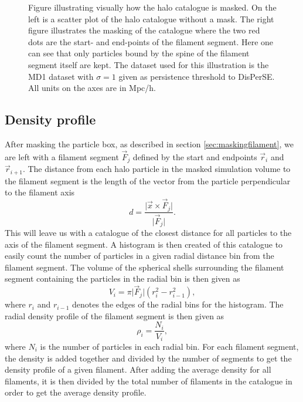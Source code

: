 \begin{figure}[htbp]
    \hspace{1em}%
    \caption{Figure illustrating visually how the halo catalogue is masked. On the left is a scatter plot of the halo catalogue without a mask. The right figure illustrates the masking of the catalogue where the two red dots are the start- and end-points of the filament segment. Here one can see that only particles bound by the spine of the filament segment itself are kept. The dataset used for this illustration is the MD1 dataset with $\sigma=1$ given as persistence threshold to DisPerSE. All units on the axes are in Mpc/h.}
    \label{fig:galaxy_catbbox}
\end{figure}
\subsection{Density profile}\label{sec:filamentdensity}
After masking the particle box, as described in section \ref{sec:maskingfilament},
we are left with a filament segment $\vec{F}_j$ defined by the start and
endpoints $\vec{r}_{i}$ and $\vec{r}_{i+1}$. The distance from each halo particle in
the masked simulation volume to the filament segment is the length of the vector
from the particle perpendicular to the filament axis
\begin{equation}\label{eq:distance_from_filament}
    d=\frac{\vert \vec{x}\times\vec{F}_j\vert}{\vert \vec{F}_j\vert}.
\end{equation}
This will leave us with a catalogue of the closest distance for all particles to
the axis of the filament segment. A histogram is then created of this catalogue
to easily count the number of particles in a given radial distance bin from the
filament segment. The volume of the spherical shells surrounding the filament segment
containing the particles in the radial bin is then given as
\begin{equation}
    V_i={\pi\vert \vec{F}_j\vert(r_i^2-r_{i-1}^2)},
\end{equation}
where $r_i$ and $r_{i-1}$ denotes the edges of the radial bins for the histogram.
The radial density profile of the filament segment is then given as
\begin{equation}
    \rho_i=\frac{N_i}{V_i},
\end{equation}
where $N_i$ is the number of particles in each radial bin. For each filament segment,
the density is added together and divided by the number of segments to get the density profile of a given filament. After adding the average density for all filaments, it is then divided by the total number of filaments in the catalogue in order to get the average density profile.
